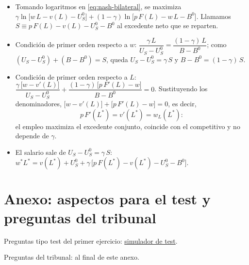 \documentclass[11pt]{article}
\begin{document}
\begin{itemize}
\item Tomando logaritmos en \eqref{eq:nash-bilateral}, se maximiza $\gamma\ln\big[w\,L-v(L)-U_S^0\big]+(1-\gamma)\ln\big[p\,F(L)-w\,L-B^0\big]$. Llamamos $S\equiv p\,F(L)-v(L)-U_S^0-B^0$ al excedente neto que se reparten.
\item Condición de primer orden respecto a $w$: $\dfrac{\gamma\,L}{U_S-U_S^0}=\dfrac{(1-\gamma)\,L}{B-B^0}$; como $(U_S-U_S^0)+(B-B^0)=S$, queda $U_S-U_S^0=\gamma\,S$ y $B-B^0=(1-\gamma)\,S$.
\item Condición de primer orden respecto a $L$: $\dfrac{\gamma\,\big[w-v'(L)\big]}{U_S-U_S^0}+\dfrac{(1-\gamma)\,\big[p\,F'(L)-w\big]}{B-B^0}=0$. Sustituyendo los denominadores, $\big[w-v'(L)\big]+\big[p\,F'(L)-w\big]=0$, es decir,
  \begin{equation}
  p\,F'(L^{*})=v'(L^{*})=w_L(L^{*}):
  \end{equation}
  el empleo maximiza el excedente conjunto, coincide con el competitivo y no depende de $\gamma$.
\item El salario sale de $U_S-U_S^0=\gamma\,S$: $w^{*}L^{*}=v(L^{*})+U_S^0+\gamma\,\big[p\,F(L^{*})-v(L^{*})-U_S^0-B^0\big]$.\findemo
\end{itemize}

\section{Anexo: aspectos para el test y preguntas del tribunal}\label{anexo:test}

\begin{anotaciones}
Preguntas tipo test del primer ejercicio: \href{https://www.victorgutierrezmarcos.es/oposicion/temario/primer-ejercicio/test/simulador.html?tema=3.A.17}{simulador de test}.

Preguntas del tribunal: al final de este anexo.
\end{anotaciones}
\end{document}
